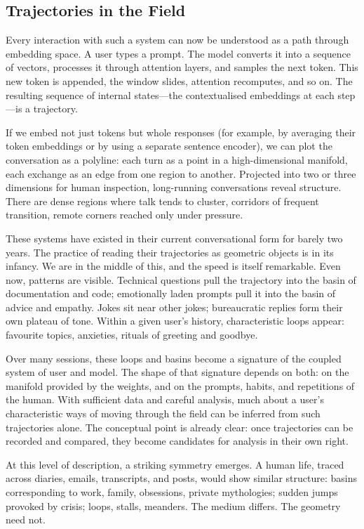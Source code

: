 \documentclass[12pt,a4paper]{report}
\begin{document}
\subsection*{Trajectories in the Field}

Every interaction with such a system can now be understood as a path through embedding space. A user types a prompt. The model converts it into a sequence of vectors, processes it through attention layers, and samples the next token. This new token is appended, the window slides, attention recomputes, and so on. The resulting sequence of internal states---the contextualised embeddings at each step---is a trajectory.

If we embed not just tokens but whole responses (for example, by averaging their token embeddings or by using a separate sentence encoder), we can plot the conversation as a polyline: each turn as a point in a high-dimensional manifold, each exchange as an edge from one region to another. Projected into two or three dimensions for human inspection, long-running conversations reveal structure. There are dense regions where talk tends to cluster, corridors of frequent transition, remote corners reached only under pressure.

These systems have existed in their current conversational form for barely two years. The practice of reading their trajectories as geometric objects is in its infancy. We are in the middle of this, and the speed is itself remarkable. Even now, patterns are visible. Technical questions pull the trajectory into the basin of documentation and code; emotionally laden prompts pull it into the basin of advice and empathy. Jokes sit near other jokes; bureaucratic replies form their own plateau of tone. Within a given user's history, characteristic loops appear: favourite topics, anxieties, rituals of greeting and goodbye.

Over many sessions, these loops and basins become a signature of the coupled system of user and model. The shape of that signature depends on both: on the manifold provided by the weights, and on the prompts, habits, and repetitions of the human. With sufficient data and careful analysis, much about a user's characteristic ways of moving through the field can be inferred from such trajectories alone. The conceptual point is already clear: once trajectories can be recorded and compared, they become candidates for analysis in their own right.

At this level of description, a striking symmetry emerges. A human life, traced across diaries, emails, transcripts, and posts, would show similar structure: basins corresponding to work, family, obsessions, private mythologies; sudden jumps provoked by crisis; loops, stalls, meanders. The medium differs. The geometry need not.
\end{document}

